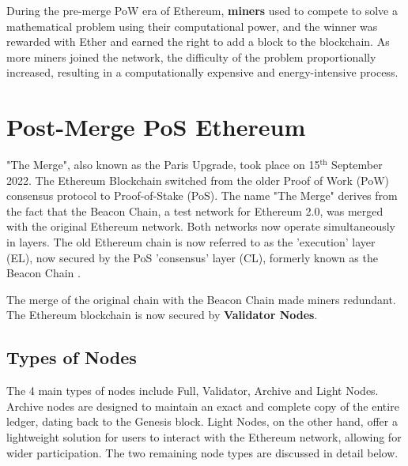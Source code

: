 
During the pre-merge PoW era of Ethereum, \textbf{miners} used to compete to solve a mathematical problem using their computational power, and the winner was rewarded with Ether and earned the right to add a block to the blockchain. As more miners joined the network, the difficulty of the problem proportionally increased, resulting in a computationally expensive and energy-intensive process.


\section{Post-Merge PoS Ethereum}

"The Merge", also known as the Paris Upgrade, took place on 15$\mathrm{^{th}}$ September 2022. The Ethereum Blockchain switched from the older Proof of Work (PoW) consensus protocol to Proof-of-Stake (PoS). The name "The Merge" derives from the fact that the Beacon Chain, a test network for Ethereum 2.0, was merged with the original Ethereum network. Both networks now operate simultaneously in layers. The old Ethereum chain is now referred to as the 'execution' layer (EL), now secured by the PoS 'consensus' layer (CL), formerly known as the Beacon Chain \cite{EthereumEthereum.org}. 

The merge of the original chain with the Beacon Chain made miners redundant. The Ethereum blockchain is now secured by \textbf{Validator Nodes}. 

\subsection{Types of Nodes}

The 4 main types of nodes include Full, Validator, Archive and Light Nodes. Archive nodes are designed to maintain an exact and complete copy of the entire ledger, dating back to the Genesis block. Light Nodes, on the other hand, offer a lightweight solution for users to interact with the Ethereum network, allowing for wider participation. The two remaining node types are discussed in detail below.

